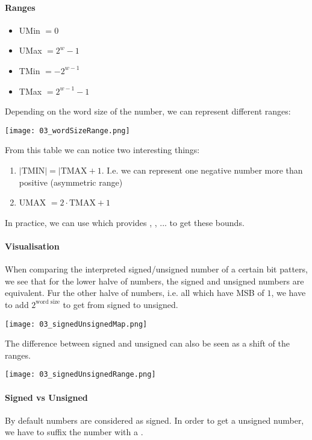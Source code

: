 \paragraph{Ranges}
\begin{itemize}
    \item UMin $= 0$
    \item UMax $= 2^w -1$
    \item TMin $=-2^{w - 1}$
    \item TMax $=2^{w-1} - 1$
\end{itemize}

Depending on the word size of the number, we can represent different ranges:

\texttt{[image: 03\_wordSizeRange.png]}

From this table we can notice two interesting things:
\begin{enumerate}
    \item $|\text{TMIN}| = |\text{TMAX} + 1$. I.e. we can represent one negative number more than positive (asymmetric range)
    \item UMAX $= 2 \cdot \text{TMAX} + 1$
\end{enumerate}

In practice, we can use  which provides , , ... to get these bounds.

\paragraph{Visualisation}
When comparing the interpreted signed/unsigned number of a certain bit patters, we see that for the lower halve of numbers, the signed and unsigned numbers are equivalent. Fur the other halve of numbers, i.e. all which have MSB of $1$, we have to add $2^{\text{word size}}$ to get from signed to unsigned. 

\texttt{[image: 03\_signedUnsignedMap.png]}

The difference between signed and unsigned can also be seen as a shift of the ranges.

\texttt{[image: 03\_signedUnsignedRange.png]}

\paragraph{Signed vs Unsigned}
By default numbers are considered as signed. In order to get a unsigned number, we have to suffix the number with a .

